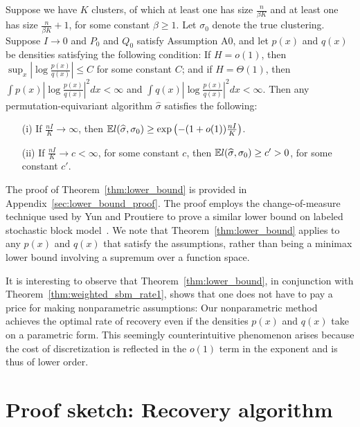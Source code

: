 \documentclass{article}
\begin{document}
\begin{theorem}
\label{thm:lower_bound}
Suppose we have $K$ clusters, of which at least one has size $\frac{n}{\beta K}$ and at least one has size $\frac{n}{\beta K}+1$, for some constant $\beta \geq 1$. Let $\sigma_0$ denote the true clustering. Suppose $I \rightarrow 0$ and $P_0$ and $Q_0$ satisfy Assumption A0, and let $p(x)$ and $q(x)$ be densities satisfying the following condition: If $H = o(1)$, then $\sup_x \left| \log \frac{p(x)}{q(x)} \right| \leq C$ for some constant $C$; and if $H = \Theta(1)$, then $\int p(x) \left| \log \frac{p(x)}{q(x)} \right|^2 dx < \infty$ and $\int q(x) \left| \log \frac{p(x)}{q(x)} \right|^2 dx < \infty$. Then any permutation-equivariant algorithm $\hat{\sigma}$ satisfies the following:
\begin{itemize}
\item[(i)] If $\frac{nI}{K} \rightarrow \infty$, then ${\mathbb E} l(\widehat{\sigma}, \sigma_0) \ge \exp \left( - (1 + o(1)) \frac{ n I}{K} \right)$.
\item[(ii)] If $\frac{nI}{K} \rightarrow c < \infty$, for some constant $c$, then ${\mathbb E}  l(\widehat{\sigma}, \sigma_0) \geq c' > 0$, for some constant $c'$.
\end{itemize}
\end{theorem}

The proof of Theorem~\ref{thm:lower_bound} is provided in Appendix~\ref{sec:lower_bound_proof}. The proof employs the change-of-measure technique used by Yun and Proutiere to prove a similar lower bound on labeled stochastic block model~\cite{yun2016optimal}. We note that Theorem~\ref{thm:lower_bound} applies to any $p(x)$ and $q(x)$ that satisfy the assumptions, rather than being a minimax lower bound involving a supremum over a function space.

\begin{remark}
It is interesting to observe that Theorem~\ref{thm:lower_bound}, in conjunction with Theorem~\ref{thm:weighted_sbm_rate1}, shows that one does not have to pay a price for making nonparametric assumptions: Our nonparametric method achieves the optimal rate of recovery even if the densities $p(x)$ and $q(x)$ take on a parametric form. This seemingly counterintuitive phenomenon arises because the cost of discretization is reflected in the $o(1)$ term in the exponent and is thus of lower order. 
\end{remark}

\section{Proof sketch: Recovery algorithm}
\label{SecProofs}
\end{document}
